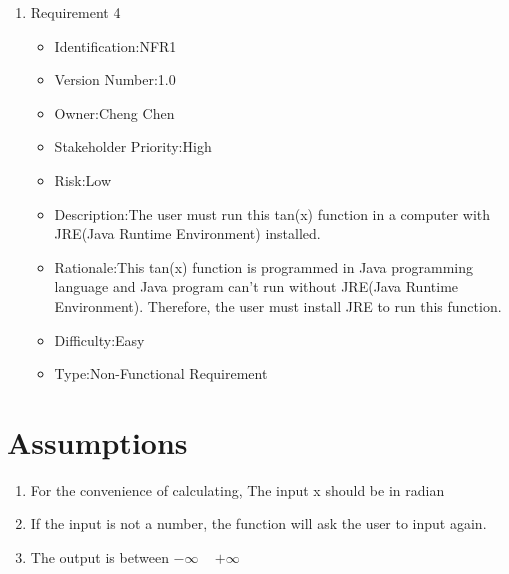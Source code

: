 \documentclass[10pt,a4paper,twoside]{article}
\begin{document}
\begin{enumerate}
\item 
Requirement 4
\begin{itemize}
\item Identification:NFR1
\item Version Number:1.0
\item Owner:Cheng Chen
\item Stakeholder Priority:High
\item Risk:Low
\item Description:The user must run this tan(x) function in a computer with JRE(Java Runtime Environment) installed.
\item Rationale:This tan(x) function is programmed in Java programming language and Java program can't run without JRE(Java Runtime Environment). Therefore, the user must install JRE to run this function.
\item Difficulty:Easy
\item Type:Non-Functional Requirement
\end{itemize} 



\end{enumerate}







\section{Assumptions}

\begin{enumerate}
\item 
For the convenience of calculating, The input x should be in radian
\item
If the input is not a number, the function will ask the user to input again.
\item
The output is between $-\infty$ ~  $+\infty$
\end{enumerate}

\printbibliography
\end{document}
